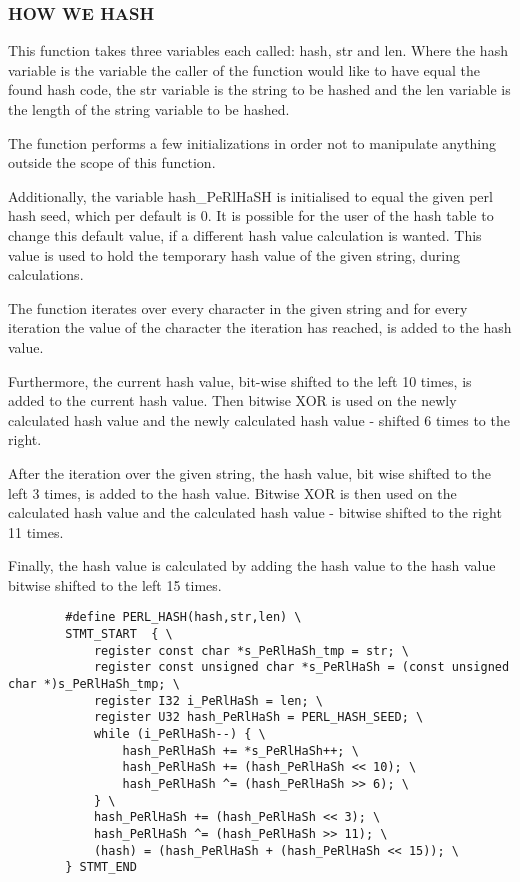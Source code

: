 \documentclass[titlepage]{article}
\begin{document}
	\subsubsection{HOW WE HASH}
	
		This function takes three variables each called: hash, str and len. Where the hash variable is the variable the caller of the function would like to have equal the found hash code, the str variable is the string to be hashed and the len variable is the length of the string variable to be hashed. 
		
		The function performs a few initializations in order not to manipulate anything outside the scope of this function. 
		
		Additionally, the variable hash\_PeRlHaSH is initialised to equal the given perl hash seed, which per default is 0. It is possible for the user of the hash table to change this default value, if a different hash value calculation is wanted. This value is used to hold the temporary hash value of the given string, during calculations. 
		
		The function iterates over every character in the given string and for every iteration the value of the character the iteration has reached, is added to the hash value. 
		
		Furthermore, the current hash value, bit-wise shifted to the left 10 times, is added to the current hash value. Then bitwise XOR is used on the newly calculated hash value and the newly calculated hash value - shifted 6 times to the right.  
		
		After the iteration over the given string, the hash value, bit wise shifted to the left 3 times, is added to the hash value. Bitwise XOR is then used on the calculated hash value and the calculated hash value - bitwise shifted to the right 11 times. 
		
		Finally, the hash value is calculated by adding the hash value to the hash value bitwise shifted to the left 15 times. 
	
		\lstset{language=perl}
		\begin{lstlisting}
		#define PERL_HASH(hash,str,len) \
		STMT_START	{ \
			register const char *s_PeRlHaSh_tmp = str; \
			register const unsigned char *s_PeRlHaSh = (const unsigned char *)s_PeRlHaSh_tmp; \
			register I32 i_PeRlHaSh = len; \
			register U32 hash_PeRlHaSh = PERL_HASH_SEED; \
			while (i_PeRlHaSh--) { \
				hash_PeRlHaSh += *s_PeRlHaSh++; \
				hash_PeRlHaSh += (hash_PeRlHaSh << 10); \
				hash_PeRlHaSh ^= (hash_PeRlHaSh >> 6); \
			} \
			hash_PeRlHaSh += (hash_PeRlHaSh << 3); \
			hash_PeRlHaSh ^= (hash_PeRlHaSh >> 11); \
			(hash) = (hash_PeRlHaSh + (hash_PeRlHaSh << 15)); \
		} STMT_END
		
		
		\end{lstlisting}
\end{document}
